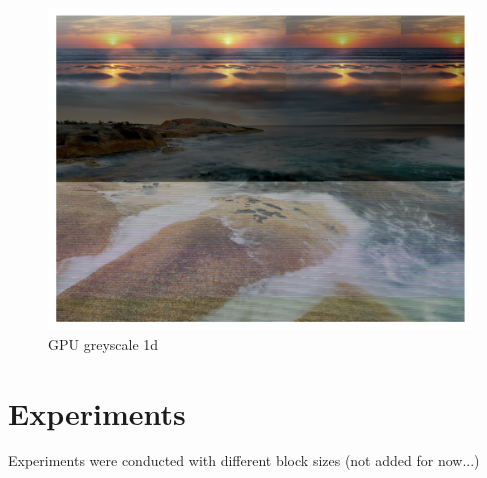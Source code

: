 \documentclass[a4paper]{article}
\begin{document}
\begin{figure}[h!]
    \centering
    \includegraphics[scale=0.5]{../src/blend.png}
    \caption{GPU greyscale 1d}
\end{figure}

\section{Experiments}
Experiments were conducted with different block sizes (not added for now...)
\end{document}
